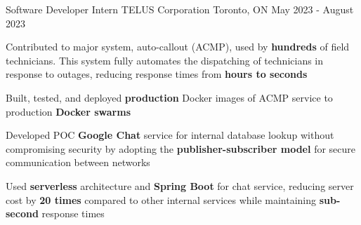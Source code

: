 \begin{cventries}
	\cventry
	{Software Developer Intern} %
	{TELUS Corporation} %
	{Toronto, ON} %
	{May 2023 - August 2023} %
	{
		\begin{cvitems} %
			\item {Contributed to major system, auto-callout (ACMP), used by \textbf{hundreds} of field technicians. This system fully automates the dispatching of technicians in response to outages, reducing response times from \textbf{hours to seconds}}
			\item {Built, tested, and deployed \textbf{production} Docker images of ACMP service to production \textbf{Docker swarms}}
			\item {Developed POC \textbf{Google Chat} service for internal database lookup without compromising security by adopting the \textbf{publisher-subscriber model} for secure communication between networks}
			\item {Used \textbf{serverless} architecture and \textbf{Spring Boot} for chat service, reducing server cost by \textbf{20 times} compared to other internal services while maintaining \textbf{sub-second} response times}
		\end{cvitems}
	}


\end{cventries}
